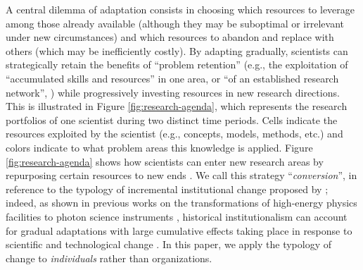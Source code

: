 \documentclass{article}
\begin{document}
A central dilemma of adaptation consists in choosing which  resources to leverage among those already available (although they may be suboptimal or irrelevant under new circumstances) and which resources to abandon and replace with others (which may be inefficiently costly). 
By adapting gradually, scientists can strategically retain  the benefits of ``problem retention'' (e.g., the exploitation of ``accumulated skills and resources'' in one area, or ``of an established research network'', \citealt[p.~106]{Gieryn1978}) while progressively investing resources in new research directions. %
This is illustrated in Figure \ref{fig:research-agenda}, %
which represents the research portfolios of one scientist during two distinct time periods. Cells indicate the resources exploited by the scientist (e.g., concepts, models, methods, etc.) and colors indicate to what problem areas this knowledge is applied.
Figure \ref{fig:research-agenda} shows how scientists can enter new research areas by repurposing certain resources to new ends \citep{Mulkay1974,schon1963displacement}. We call this strategy ``\textit{conversion}'', in reference to the typology of incremental institutional change proposed by \citet{mahoney_thelen_2009}; indeed, as shown in previous works on the transformations of high-energy physics facilities to photon science instruments \citep{Hallonsten2013,hallonsten2015formation,Heinze2017a}, historical institutionalism can account for gradual adaptations with large cumulative effects taking place in response to scientific and technological change \citep{Heinze2012}. In this paper, we apply the typology of change to \textit{individuals} rather than organizations. 
\end{document}
